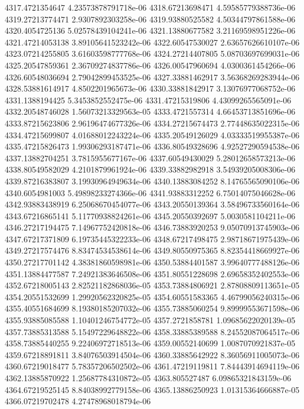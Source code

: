 {4317.4721354647 4.23573878791718e-06
4318.67213698471 4.59585779388736e-06
4319.27213774471 2.9307892303258e-06
4319.93880525582 4.50344797861588e-06
4320.4054725136 5.02578439104241e-06
4321.13880677582 3.21169598951226e-06
4321.47214053138 3.89105641523242e-06
4322.60547530027 2.63657626610107e-06
4323.07214255805 3.61603598777768e-06
4324.27214407805 5.08703697699031e-06
4325.20547859361 2.36709274837786e-06
4326.00547960694 4.0300361454266e-06
4326.60548036694 2.79042899453525e-06
4327.33881462917 3.56368269283944e-06
4328.53881614917 4.8502201965673e-06
4330.33881842917 3.13076977068752e-06
4331.1388194425 5.3453852552475e-06
4331.47215319806 4.43099265565091e-06
4332.20548746028 1.56073213329563e-05
4333.4721557314 4.66453713851696e-06
4333.87215623806 2.96196474677326e-06
4334.27215674473 2.77448635022315e-06
4334.47215699807 4.01688012243224e-06
4335.20549126029 4.03333519955387e-06
4335.47215826473 1.99306293187471e-06
4336.80549328696 4.92527290594538e-06
4337.13882704251 3.7815955677167e-06
4337.60549430029 5.28012658573213e-06
4338.80549582029 4.2101879961924e-06
4339.33882982918 3.54939205008306e-06
4339.87216383807 3.19930964949634e-06
4340.13883084252 8.14765565090106e-06
4340.6054981003 5.49898233274366e-06
4341.93883312252 6.75014075046628e-06
4342.93883438919 6.25068670454077e-06
4343.20550139364 3.58496733560164e-06
4343.67216865141 5.11770938824261e-06
4345.20550392697 5.0030581104211e-06
4346.27217194475 7.14967752420818e-06
4346.73883920253 9.05070913745903e-06
4347.67217371809 6.19735445322233e-06
4348.67217498475 2.98718671975439e-06
4349.27217574476 8.83474534538614e-06
4349.80550975365 8.82354418669927e-06
4350.27217701142 4.38381860598981e-06
4350.53884401587 3.99640777488126e-06
4351.13884477587 7.24921383646508e-06
4351.80551228698 2.69658352402553e-06
4352.67218005143 2.82521182868036e-05
4353.73884806921 2.87808809113651e-05
4354.20551532699 1.29920562320825e-05
4354.60551583365 4.46799056240315e-06
4355.40551684699 8.19380185207032e-06
4355.73885060254 9.89999553671598e-06
4355.93885085588 1.10401246754772e-05
4357.2721858781 1.09685622020139e-05
4357.73885313588 5.15497229648822e-06
4358.33885389588 8.24552087064517e-06
4358.73885440255 9.22406972718513e-06
4359.00552140699 1.0087070921837e-05
4359.67218891811 3.84076503914504e-06
4360.33885642922 8.36056911005073e-06
4360.67219018477 5.78357206502502e-06
4361.47219119811 7.84443914694119e-06
4362.13885870922 1.25687784310872e-05
4363.805527487 6.09865321843159e-06
4364.67219525145 8.84038992779158e-06
4365.13886250923 1.01315364666887e-05
4366.07219702478 4.27478968018794e-06
}
